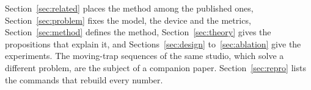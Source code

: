 Section~\ref{sec:related} places the method among the published ones, Section~\ref{sec:problem} fixes the model, the device and the metrics, Section~\ref{sec:method} defines the method,
Section~\ref{sec:theory} gives the propositions that explain it, and Sections~\ref{sec:design} to~\ref{sec:ablation} give the experiments. The moving-trap sequences of the same studio, which solve a different problem, are the subject of a companion paper. Section~\ref{sec:repro} lists the commands that rebuild every number.
